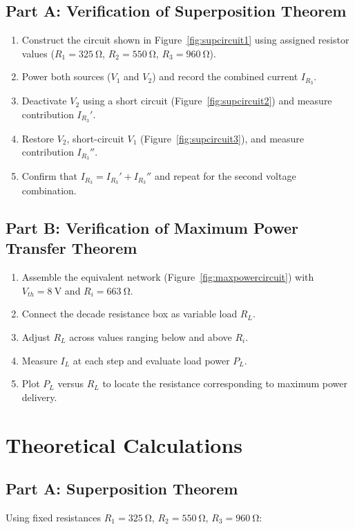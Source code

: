\subsection*{Part A: Verification of Superposition Theorem}
\begin{enumerate}
	\item Construct the circuit shown in Figure~\ref{fig:supcircuit1} using assigned resistor values ($R_1=\qty{325}{\ohm}$, $R_2=\qty{550}{\ohm}$, $R_3=\qty{960}{\ohm}$).
	\item Power both sources ($V_1$ and $V_2$) and record the combined current $I_{R_3}$.
	\item Deactivate $V_2$ using a short circuit (Figure~\ref{fig:supcircuit2}) and measure contribution $I_{R_3}'$.
	\item Restore $V_2$, short-circuit $V_1$ (Figure~\ref{fig:supcircuit3}), and measure contribution $I_{R_3}''$.
	\item Confirm that $I_{R_3} = I_{R_3}' + I_{R_3}''$ and repeat for the second voltage combination.
\end{enumerate}

\subsection*{Part B: Verification of Maximum Power Transfer Theorem}
\begin{enumerate}
	\item Assemble the equivalent network (Figure~\ref{fig:maxpowercircuit}) with $V_{th}=\qty{8}{\volt}$ and $R_i=\qty{663}{\ohm}$.
	\item Connect the decade resistance box as variable load $R_L$.
	\item Adjust $R_L$ across values ranging below and above $R_i$.
	\item Measure $I_L$ at each step and evaluate load power $P_L$.
	\item Plot $P_L$ versus $R_L$ to locate the resistance corresponding to maximum power delivery.
\end{enumerate}

\section{Theoretical Calculations}

\subsection{Part A: Superposition Theorem}
Using fixed resistances $R_1=\qty{325}{\ohm}$, $R_2=\qty{550}{\ohm}$, $R_3=\qty{960}{\ohm}$:


